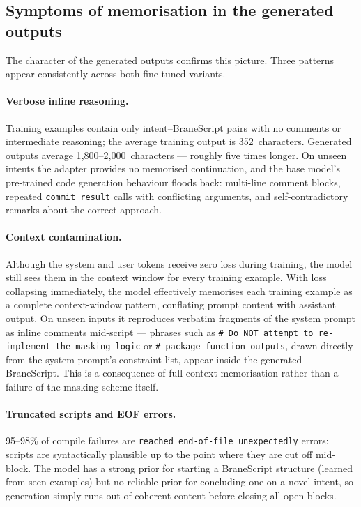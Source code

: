 \subsection{Symptoms of memorisation in the generated outputs}

The character of the generated outputs confirms this picture. Three patterns
appear consistently across both fine-tuned variants.

\paragraph{Verbose inline reasoning.}
Training examples contain only intent--BraneScript pairs with no comments or
intermediate reasoning; the average training output is 352~characters.
Generated outputs average 1{,}800--2{,}000~characters --- roughly five times
longer. On unseen intents the adapter provides no memorised continuation, and
the base model's pre-trained code generation behaviour floods back: multi-line
comment blocks, repeated \texttt{commit\_result} calls with conflicting
arguments, and self-contradictory remarks about the correct approach.

\paragraph{Context contamination.}
Although the system and user tokens receive zero loss during training, the
model still sees them in the context window for every training example. With
loss collapsing immediately, the model effectively memorises each
training example as a complete context-window pattern, conflating prompt
content with assistant output. On unseen inputs it reproduces verbatim
fragments of the system prompt as inline comments mid-script --- phrases such
as \texttt{\# Do NOT attempt to re-implement the masking logic} or
\texttt{\# package function outputs}, drawn directly from the system prompt's
constraint list, appear inside the generated BraneScript. This is a
consequence of full-context memorisation rather than a failure of the
masking scheme itself.

\paragraph{Truncated scripts and EOF errors.}
95--98\% of compile failures are \texttt{reached end-of-file unexpectedly}
errors: scripts are syntactically plausible up to the point where they are
cut off mid-block. The model has a strong prior for starting a BraneScript
structure (learned from seen examples) but no reliable prior for concluding
one on a novel intent, so generation simply runs out of coherent content
before closing all open blocks.

